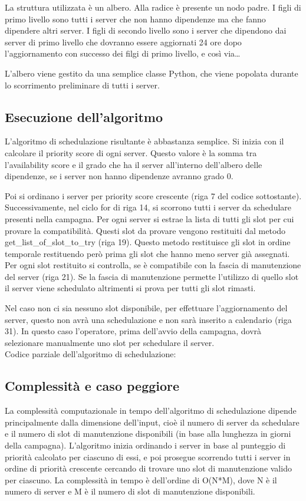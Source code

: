 La struttura utilizzata è un albero. Alla radice è presente un nodo padre. 
I figli di primo livello sono tutti i server che non hanno dipendenze ma che 
fanno dipendere altri server.
I figli di secondo livello sono i server che dipendono dai server di primo livello
che dovranno essere aggiornati 24 ore dopo l'aggiornamento con successo dei filgi 
di primo livello, e così via\dots

L’albero viene gestito da una semplice classe Python, che viene popolata durante 
lo scorrimento preliminare di tutti i server.


\subsection{Esecuzione dell’algoritmo}
L’algoritmo di schedulazione risultante è abbastanza semplice. 
Si inizia con il calcolare il priority score di ogni server.
Questo valore è la somma tra l’availability score e il grado che 
ha il server all'interno dell’albero delle dipendenze, se i server non 
hanno dipendenze avranno grado 0.

Poi si ordinano i server per priority score crescente (riga 7 del codice sottostante).
Successivamente, nel ciclo for di riga 14, si scorrono tutti i server 
da schedulare presenti nella campagna.
Per ogni server si estrae la lista di tutti gli slot per cui provare 
la compatibilità. Questi slot da provare vengono restituiti dal metodo 
get\_list\_of\_slot\_to\_try (riga 19). Questo metodo restituisce gli slot 
in ordine temporale restituendo però prima gli slot che hanno meno server 
già assegnati.
Per ogni slot restituito si controlla, se è compatibile con la fascia di 
manutenzione del server (riga 21). Se la fascia di manutenzione permette 
l’utilizzo di quello slot il server viene schedulato altrimenti si prova 
per tutti gli slot rimasti.

Nel caso non ci sia nessuno slot disponibile, per effettuare 
l’aggiornamento del server, questo non avrà una schedulazione e non sarà 
inserito a calendario (riga 31). In questo caso l’operatore, prima 
dell’avvio della campagna, dovrà selezionare manualmente uno slot per 
schedulare il server.\\

Codice parziale dell'algoritmo di schedulazione:



\subsection{Complessità e caso peggiore}
La complessità computazionale in tempo dell'algoritmo di schedulazione dipende 
principalmente dalla dimensione dell'input, cioè il numero di server da 
schedulare e il numero di slot di manutenzione disponibili (in base alla 
lunghezza in giorni della campagna).
L'algoritmo inizia ordinando i server in base al punteggio di priorità 
calcolato per ciascuno di essi, e poi prosegue scorrendo tutti i server in 
ordine di priorità crescente cercando di trovare uno slot di manutenzione 
valido per ciascuno. La complessità in tempo è dell'ordine di O(N*M), 
dove N è il numero di server e M è il numero di slot di manutenzione 
disponibili.\\

